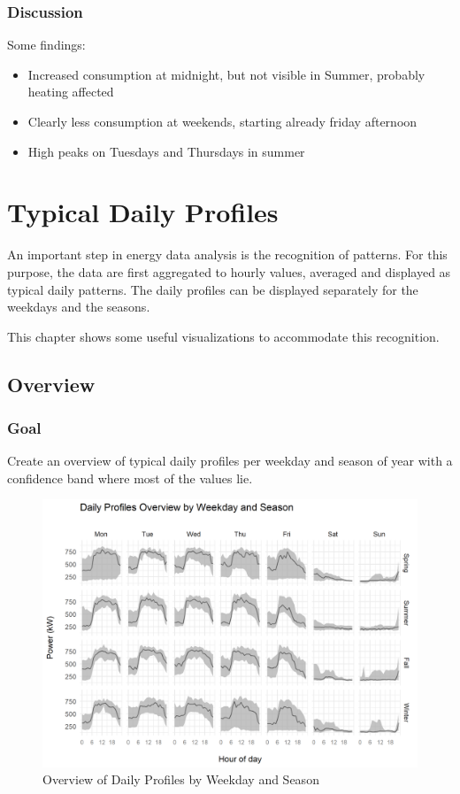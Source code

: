 \documentclass[
]{book}
\begin{document}
\hypertarget{discussion-6}{%
\subsection{Discussion}\label{discussion-6}}

Some findings:

\begin{itemize}
\item
  Increased consumption at midnight, but not visible in Summer, probably heating affected
\item
  Clearly less consumption at weekends, starting already friday afternoon
\item
  High peaks on Tuesdays and Thursdays in summer
\end{itemize}

\hypertarget{typical-daily-profiles}{%
\chapter{Typical Daily Profiles}\label{typical-daily-profiles}}

An important step in energy data analysis is the recognition of patterns. For this purpose, the data are first aggregated to hourly values, averaged and displayed as typical daily patterns. The daily profiles can be displayed separately for the weekdays and the seasons.

This chapter shows some useful visualizations to accommodate this recognition.

\hypertarget{overview}{%
\section{Overview}\label{overview}}

\hypertarget{goal-8}{%
\subsection{Goal}\label{goal-8}}

Create an overview of typical daily profiles per weekday and season of year with a confidence band where most of the values lie.

\begin{figure}
\includegraphics[width=0.7\linewidth]{images/plotDailyProfOverview} \caption{Overview of Daily Profiles by Weekday and Season}\label{fig:unnamed-chunk-17}
\end{figure}
\end{document}
